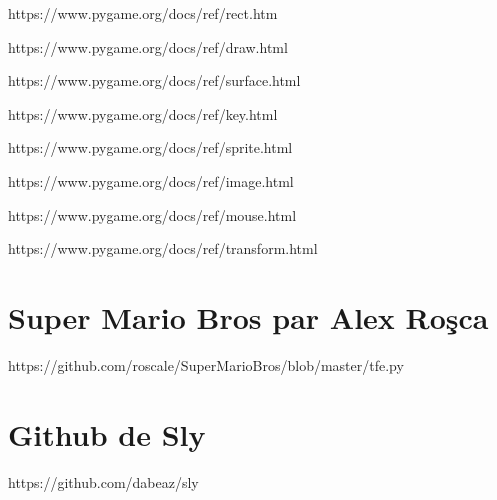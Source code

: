 \documentclass{report}
\begin{document}
\par https://www.pygame.org/docs/ref/rect.htm
\newline\par https://www.pygame.org/docs/ref/draw.html
\newline\par https://www.pygame.org/docs/ref/surface.html
\newline\par https://www.pygame.org/docs/ref/key.html
\newline\par https://www.pygame.org/docs/ref/sprite.html
\newline\par https://www.pygame.org/docs/ref/image.html
\newline\par https://www.pygame.org/docs/ref/mouse.html
\newline\par https://www.pygame.org/docs/ref/transform.html

\section*{Super Mario Bros par Alex Roşca}

https://github.com/roscale/SuperMarioBros/blob/master/tfe.py

\section*{Github de Sly}

https://github.com/dabeaz/sly
\end{document}
